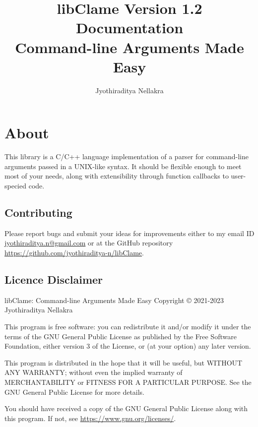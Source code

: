 \documentclass[letterpaper]{article}
\title{libClame Version 1.2 Documentation \\ Command-line Arguments Made Easy}
\author{Jyothiraditya Nellakra}
\begin{document}
\maketitle

\section*{About}

This library is a C/C++ language implementation of a parser for command-line arguments passed in a UNIX-like syntax. It should be flexible enough to meet most of your needs, along with extensibility through function callbacks to user-specied code.

\subsection*{Contributing}

Please report bugs and submit your ideas for improvements either to my email ID \url{jyothiraditya.n@gmail.com} or at the GitHub repository \url{https://github.com/jyothiraditya-n/libClame}. 

\subsection*{Licence Disclaimer}

libClame: Command-line Arguments Made Easy Copyright {\copyright} 2021-2023 Jyothiraditya Nellakra

This program is free software: you can redistribute it and/or modify it under the terms of the GNU General Public License as published by the Free Software Foundation, either version 3 of the License, or (at your option) any later  version.

This program is distributed in the hope that it will be useful, but WITHOUT ANY WARRANTY; without even the implied warranty of MERCHANTABILITY or FITNESS FOR A PARTICULAR PURPOSE. See the GNU General Public License for more details.

You should have received a copy of the GNU General Public License along with this program. If not, see \url{https://www.gnu.org/licenses/}.

\tableofcontents














\end{document}
